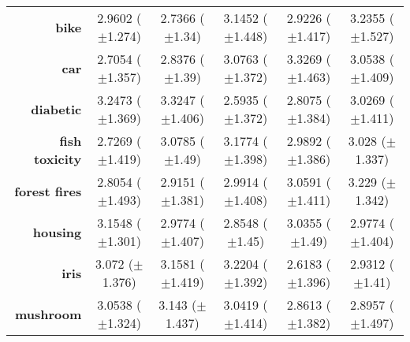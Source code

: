 \begin{table}[htbp]
{\begin{tabular}{r|ccccc}
			\textbf{bike}                & \cellcolor[rgb]{ 1,  .922,  .518}2.9602 ($\pm$1.274)    & \cellcolor[rgb]{ .388,  .745,  .482}2.7366 ($\pm$1.34)  & \cellcolor[rgb]{ .984,  .58,  .455}3.1452 ($\pm$1.448)  & \cellcolor[rgb]{ .894,  .89,  .51}2.9226 ($\pm$1.417)   & \cellcolor[rgb]{ .973,  .412,  .42}3.2355 ($\pm$1.527)  \\
			\textbf{car}                 & \cellcolor[rgb]{ .388,  .745,  .482}2.7054 ($\pm$1.357) & \cellcolor[rgb]{ .62,  .812,  .494}2.8376 ($\pm$1.39)   & \cellcolor[rgb]{ 1,  .882,  .51}3.0763 ($\pm$1.372)     & \cellcolor[rgb]{ .973,  .412,  .42}3.3269 ($\pm$1.463)  & \cellcolor[rgb]{ 1,  .922,  .518}3.0538 ($\pm$1.409)    \\
			\textbf{diabetic}            & \cellcolor[rgb]{ .98,  .545,  .447}3.2473 ($\pm$1.369)  & \cellcolor[rgb]{ .973,  .412,  .42}3.3247 ($\pm$1.406)  & \cellcolor[rgb]{ .388,  .745,  .482}2.5935 ($\pm$1.372) & \cellcolor[rgb]{ .69,  .831,  .498}2.8075 ($\pm$1.384)  & \cellcolor[rgb]{ 1,  .922,  .518}3.0269 ($\pm$1.411)    \\
			\textbf{fish toxicity}       & \cellcolor[rgb]{ .388,  .745,  .482}2.7269 ($\pm$1.419) & \cellcolor[rgb]{ .992,  .753,  .486}3.0785 ($\pm$1.49)  & \cellcolor[rgb]{ .973,  .412,  .42}3.1774 ($\pm$1.398)  & \cellcolor[rgb]{ .918,  .898,  .51}2.9892 ($\pm$1.386)  & \cellcolor[rgb]{ 1,  .922,  .518}3.028 ($\pm$1.337)     \\
			\textbf{forest fires}        & \cellcolor[rgb]{ .388,  .745,  .482}2.8054 ($\pm$1.493) & \cellcolor[rgb]{ .745,  .847,  .502}2.9151 ($\pm$1.381) & \cellcolor[rgb]{ 1,  .922,  .518}2.9914 ($\pm$1.408)    & \cellcolor[rgb]{ .996,  .776,  .49}3.0591 ($\pm$1.411)  & \cellcolor[rgb]{ .973,  .412,  .42}3.229 ($\pm$1.342)   \\
			\textbf{housing}             & \cellcolor[rgb]{ .973,  .412,  .42}3.1548 ($\pm$1.301)  & \cellcolor[rgb]{ 1,  .922,  .518}2.9774 ($\pm$1.407)    & \cellcolor[rgb]{ .388,  .745,  .482}2.8548 ($\pm$1.45)  & \cellcolor[rgb]{ .992,  .757,  .486}3.0355 ($\pm$1.49)  & \cellcolor[rgb]{ 1,  .922,  .518}2.9774 ($\pm$1.404)    \\
			\textbf{iris}                & \cellcolor[rgb]{ 1,  .922,  .518}3.072 ($\pm$1.376)     & \cellcolor[rgb]{ .984,  .627,  .463}3.1581 ($\pm$1.419) & \cellcolor[rgb]{ .973,  .412,  .42}3.2204 ($\pm$1.392)  & \cellcolor[rgb]{ .388,  .745,  .482}2.6183 ($\pm$1.396) & \cellcolor[rgb]{ .808,  .867,  .506}2.9312 ($\pm$1.41)  \\
			\textbf{mushroom}            & \cellcolor[rgb]{ 1,  .863,  .51}3.0538 ($\pm$1.324)     & \cellcolor[rgb]{ .973,  .412,  .42}3.143 ($\pm$1.437)   & \cellcolor[rgb]{ 1,  .922,  .518}3.0419 ($\pm$1.414)    & \cellcolor[rgb]{ .388,  .745,  .482}2.8613 ($\pm$1.382) & \cellcolor[rgb]{ .502,  .776,  .486}2.8957 ($\pm$1.497) \\

\end{tabular}}
\end{table}
